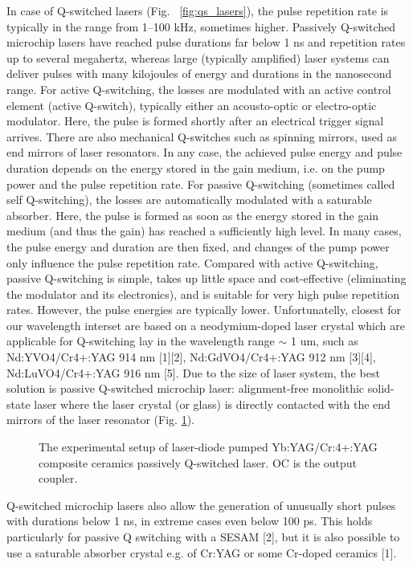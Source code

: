 In case of Q-switched lasers (Fig. ~\ref{fig:qs_lasers}), the pulse repetition rate is typically in the range from 1–100 kHz, sometimes higher. Passively Q-switched microchip lasers have reached pulse durations far below 1 ns and repetition rates up to several megahertz, whereas large (typically amplified) laser systems can deliver pulses with many kilojoules of energy and durations in the nanosecond range. For active Q-switching, the losses are modulated with an active control element (active Q-switch), typically either an acousto-optic or electro-optic modulator. Here, the pulse is formed shortly after an electrical trigger signal arrives. There are also mechanical Q-switches such as spinning mirrors, used as end mirrors of laser resonators. In any case, the achieved pulse energy and pulse duration depends on the energy stored in the gain medium, i.e. on the pump power and the pulse repetition rate.
For passive Q-switching (sometimes called self Q-switching), the losses are automatically modulated with a saturable absorber.
Here, the pulse is formed as soon as the energy stored in the gain medium (and thus the gain) has reached a sufficiently high level. In many cases, the pulse energy and duration are then fixed, and changes of the pump power only influence the pulse repetition rate.
Compared with active Q-switching, passive Q-switching is simple, takes up little space and cost-effective (eliminating the modulator and its electronics), and is suitable for very high pulse repetition rates. However, the pulse energies are typically lower. 
Unfortunatelly, closest for our wavelength interset are based on a neodymium-doped laser crystal which are applicable for Q-switching lay in the wavelength range $\sim$ 1 um, such as
Nd:YVO4/Cr4+:YAG 914 nm [1][2], Nd:GdVO4/Cr4+:YAG 912 nm [3][4], Nd:LuVO4/Cr4+:YAG 916 nm [5].
Due to the size of laser system, the best solution is passive Q-switched microchip laser: alignment-free monolithic solid-state laser where the laser crystal (or glass) is directly contacted with the end mirrors of the laser resonator (Fig. \ref{fig:micro}).

\begin{figure}[h]
\vspace{1cm} 
\caption{The experimental setup of laser-diode pumped Yb:YAG/Cr:4+:YAG composite ceramics passively Q-switched laser. OC is the output coupler.}
\label{fig:micro} 
\end{figure}

Q-switched microchip lasers also allow the generation of unusually short pulses with durations below 1 ns, in extreme cases even below 100 ps. This holds particularly for passive Q switching with a SESAM [2], but it is also possible to use a saturable absorber crystal e.g. of Cr:YAG or some Cr-doped ceramics [1].


